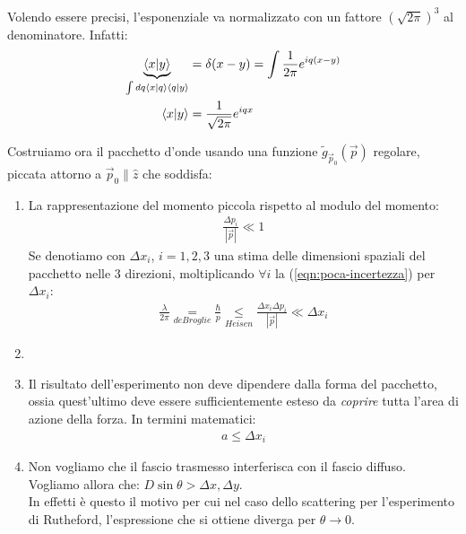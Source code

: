 \documentclass[../../FisicaTeorica.tex]{subfiles}
\begin{document}
Volendo essere precisi, l'esponenziale va normalizzato con un fattore $(\sqrt{2\pi})^3$ al denominatore. Infatti:
\begin{align*}
\underbrace{\braket{x|y}}_{\int dq \braket{x|q}\braket{q|y}} &= \delta(x-y) = \int \frac{1}{2\pi} e^{iq(x-y)}\\
\braket{x|y} &= \frac{1}{\sqrt{2\pi}} e^{iqx}
\end{align*}


Costruiamo ora il pacchetto d'onde usando una funzione $\tilde{g}_{\vec{p}_0}(\vec{p})$ regolare, piccata attorno a $\vec{p}_0 \parallel \hat{z}$ che soddisfa:
\begin{enumerate}
\item La rappresentazione del momento piccola rispetto al modulo del momento:
\begin{align}
\frac{\Delta p_i}{|\vec{p}|} \ll 1
\label{eqn:poca-incertezza}
\end{align}
Se denotiamo con $\Delta x_i$, $i=1,2,3$ una stima delle dimensioni spaziali del pacchetto nelle $3$ direzioni, moltiplicando $\forall i$ la (\ref{eqn:poca-incertezza}) per $\Delta x_i$:
\begin{align*}
\frac{\lambda}{2\pi} \underset{de Broglie}{=} \frac{\hbar}{p} \underset{Heisen}{\leq} \frac{\Delta x_i \Delta p_i}{|\vec{p}|} \ll \Delta x_i
\end{align*}
\item 
\item Il risultato dell'esperimento non deve dipendere dalla forma del pacchetto, ossia quest'ultimo deve essere sufficientemente esteso da \textit{coprire} tutta l'area di azione della forza. In termini matematici:
\begin{align*}
a \leq \Delta x_i
\end{align*}
\item Non vogliamo che il fascio trasmesso interferisca con il fascio diffuso. Vogliamo allora che: $D\sin\theta > \Delta x, \Delta y$.\\
In effetti è questo il motivo per cui nel caso dello scattering per l'esperimento di Rutheford, l'espressione che si ottiene diverga per $\theta \to 0$.
\end{enumerate}
\end{document}
